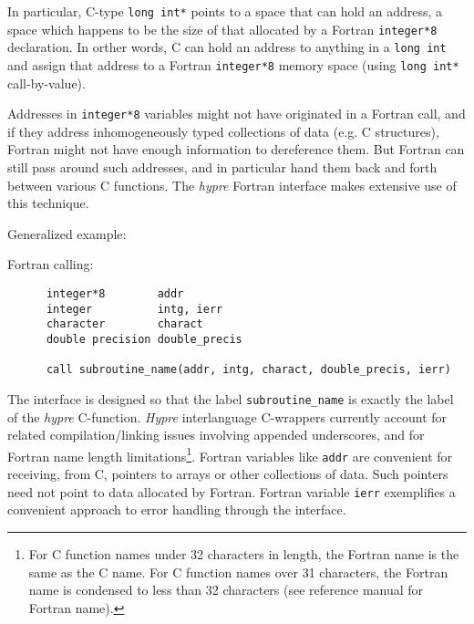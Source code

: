 \vspace{0.2in}

In particular, C-type
\verb+long int*+ points to a space that can hold an address, a space
which happens to be the size of that allocated by a Fortran
\verb+integer*8+ declaration.
In orther words, C can hold an address to anything in a \verb+long int+ and
assign that address to a Fortran \verb+integer*8+ memory space
(using \verb+long int*+ call-by-value).

Addresses in \verb+integer*8+ variables might not have originated
in a Fortran call, and if they address inhomogeneously typed collections
of data (e.g. C structures), Fortran might not have enough information to
dereference them.  But Fortran can still pass around such addresses, and in
particular hand them back and forth between various C functions.  The
{\slshape hypre} Fortran interface makes extensive use of this technique.

\vspace{0.1in}

\noindent Generalized example:

\vspace{0.1in}

  Fortran calling:
\begin{verbatim}
      integer*8        addr
      integer          intg, ierr
      character        charact
      double precision double_precis

      call subroutine_name(addr, intg, charact, double_precis, ierr)
\end{verbatim}

The interface is designed so that the label \verb+subroutine_name+ is exactly
the label of the {\slshape hypre} C-function.
{\slshape Hypre} interlanguage C-wrappers currently
account for related compilation/linking issues involving appended
underscores, and for Fortran name length limitations\footnote{For C
function names under 32 characters in length, the Fortran name is the same
as the C name.  For C function names over 31 characters, the Fortran
name is condensed to less than 32 characters (see reference manual for
Fortran name).}.
Fortran variables like \verb+addr+
are convenient for receiving, from C, pointers to arrays or other
collections of data.  Such pointers need not point to data allocated by
Fortran.  Fortran variable \verb+ierr+ exemplifies a convenient approach
to error handling through the interface.

\vspace{0.1in}

